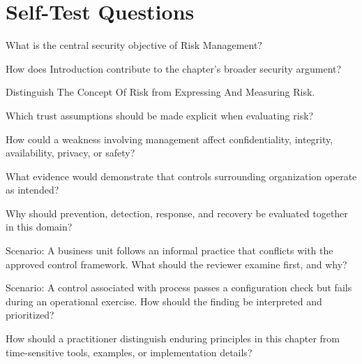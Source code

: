 \documentclass[11pt,letterpaper]{article}
\begin{document}
\section*{Self-Test Questions}
\begin{CornellRecallList}
\item What is the central security objective of Risk Management?
\item How does Introduction contribute to the chapter's broader security argument?
\item Distinguish The Concept Of Risk from Expressing And Measuring Risk.
\item Which trust assumptions should be made explicit when evaluating risk?
\item How could a weakness involving management affect confidentiality, integrity, availability, privacy, or safety?
\item What evidence would demonstrate that controls surrounding organization operate as intended?
\item Why should prevention, detection, response, and recovery be evaluated together in this domain?
\item Scenario: A business unit follows an informal practice that conflicts with the approved control framework. What should the reviewer examine first, and why?
\item Scenario: A control associated with process passes a configuration check but fails during an operational exercise. How should the finding be interpreted and prioritized?
\item How should a practitioner distinguish enduring principles in this chapter from time-sensitive tools, examples, or implementation details?
\end{CornellRecallList}
\end{document}
